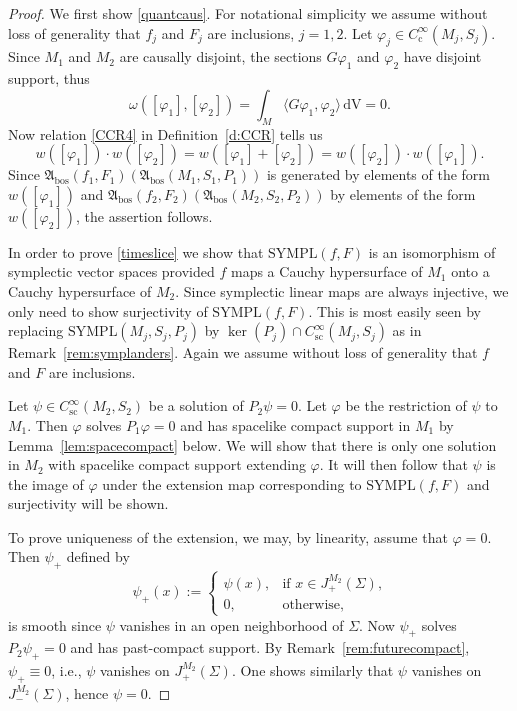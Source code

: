 \documentclass[a4paper,11pt]{amsart}
\theoremstyle{definition}
\begin{document}
\begin{proof}
We first show \eqref{quantcaus}.
For notational simplicity we assume without loss of generality that $f_j$ and $F_j$ are inclusions, $j=1,2$.
Let ${\varphi}_j\in{C^\infty_\mathrm{c}}(M_j,S_j)$.
Since $M_1$ and $M_2$ are causally disjoint, the sections $G{\varphi}_1$ and ${\varphi}_2$ have disjoint support, thus
$$
\omega([{\varphi}_1],[{\varphi}_2])=\int_M{\langle} G{\varphi}_1,{\varphi}_2{\rangle} {\,\mathrm{dV}} = 0.
$$
Now relation \eqref{CCR4} in Definition~\ref{d:CCR} tells us
$$
w([{\varphi}_1])\cdot w([{\varphi}_2]) = w([{\varphi}_1]+[{\varphi}_2]) = w([{\varphi}_2])\cdot w([{\varphi}_1]) .
$$
Since ${\mathfrak{A}_\mathrm{bos}}(f_1,F_1)({\mathfrak{A}_\mathrm{bos}}(M_1,S_1,P_1))$ is generated by elements of the form $w([{\varphi}_1])$ and ${\mathfrak{A}_\mathrm{bos}}(f_2,F_2)({\mathfrak{A}_\mathrm{bos}}(M_2,S_2,P_2))$ by elements of the form $w([{\varphi}_2])$, the assertion follows.

In order to prove \eqref{timeslice} we show that ${\mathrm{SYMPL}}(f,F)$ is an isomorphism of symplectic vector spaces provided $f$ maps a Cauchy hypersurface of $M_1$ onto a Cauchy hypersurface of $M_2$.
Since symplectic linear maps are always injective, we only need to show surjectivity of ${\mathrm{SYMPL}}(f,F)$.
This is most easily seen by replacing ${\mathrm{SYMPL}}(M_j,S_j,P_j)$ by $\ker(P_j)\cap{C^\infty_\mathrm{sc}}(M_j,S_j)$ as in Remark~\ref{rem:symplanders}.
Again we assume without loss of generality that $f$ and $F$ are inclusions.

Let $\psi\in{C^\infty_\mathrm{sc}}(M_2,S_2)$ be a solution of $P_2\psi=0$.
Let ${\varphi}$ be the restriction of $\psi$ to $M_1$.
Then ${\varphi}$ solves $P_1{\varphi}=0$ and has spacelike compact support in $M_1$ by Lemma~\ref{lem:spacecompact} below.
We will show that there is only one solution in $M_2$ with spacelike compact support extending ${\varphi}$.
It will then follow that $\psi$ is the image of ${\varphi}$ under the extension map corresponding to ${\mathrm{SYMPL}}(f,F)$ and surjectivity will be shown.

To prove uniqueness of the extension, we may, by linearity, assume that ${\varphi}=0$.
Then $\psi_+$ defined by
$$
\psi_+(x) := \begin{cases}
              \psi(x), & \mbox{if $x\in J_+^{M_2}(\Sigma)$,}\\
               0,      & \mbox{otherwise,}
             \end{cases}
$$
is smooth since $\psi$ vanishes in an open neighborhood of $\Sigma$.
Now $\psi_+$ solves $P_2\psi_+=0$ and has past-compact support.
By Remark~\ref{rem:futurecompact}, $\psi_+\equiv 0$, i.e., $\psi$ vanishes on $J_+^{M_2}(\Sigma)$.
One shows similarly that $\psi$ vanishes on $J_-^{M_2}(\Sigma)$, hence $\psi=0$.
\end{proof}
\end{document}
